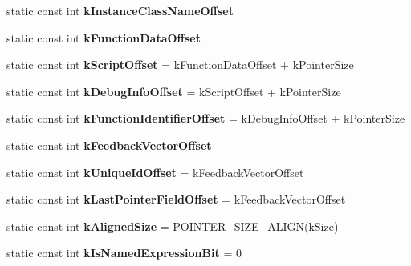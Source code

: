 \begin{DoxyCompactItemize}
\item 
static const int {\bfseries k\+Instance\+Class\+Name\+Offset}
\item 
static const int {\bfseries k\+Function\+Data\+Offset}
\item 
static const int {\bfseries k\+Script\+Offset} = k\+Function\+Data\+Offset + k\+Pointer\+Size\hypertarget{classv8_1_1internal_1_1_shared_function_info_a1fdab5516ff08f6876cffc0a75e18c44}{}\label{classv8_1_1internal_1_1_shared_function_info_a1fdab5516ff08f6876cffc0a75e18c44}

\item 
static const int {\bfseries k\+Debug\+Info\+Offset} = k\+Script\+Offset + k\+Pointer\+Size\hypertarget{classv8_1_1internal_1_1_shared_function_info_a3e5e9653b37e7a05aeec489c67aa229a}{}\label{classv8_1_1internal_1_1_shared_function_info_a3e5e9653b37e7a05aeec489c67aa229a}

\item 
static const int {\bfseries k\+Function\+Identifier\+Offset} = k\+Debug\+Info\+Offset + k\+Pointer\+Size\hypertarget{classv8_1_1internal_1_1_shared_function_info_a9a1beaaa0ed44ab0309fb99b127f1450}{}\label{classv8_1_1internal_1_1_shared_function_info_a9a1beaaa0ed44ab0309fb99b127f1450}

\item 
static const int {\bfseries k\+Feedback\+Vector\+Offset}
\item 
static const int {\bfseries k\+Unique\+Id\+Offset} = k\+Feedback\+Vector\+Offset\hypertarget{classv8_1_1internal_1_1_shared_function_info_a35f68f621426325d9e666d9ab31caca5}{}\label{classv8_1_1internal_1_1_shared_function_info_a35f68f621426325d9e666d9ab31caca5}

\item 
static const int {\bfseries k\+Last\+Pointer\+Field\+Offset} = k\+Feedback\+Vector\+Offset\hypertarget{classv8_1_1internal_1_1_shared_function_info_a94b4ac96bc87bfa5700bc6e30c56903a}{}\label{classv8_1_1internal_1_1_shared_function_info_a94b4ac96bc87bfa5700bc6e30c56903a}

\item 
static const int {\bfseries k\+Aligned\+Size} = P\+O\+I\+N\+T\+E\+R\+\_\+\+S\+I\+Z\+E\+\_\+\+A\+L\+I\+GN(k\+Size)\hypertarget{classv8_1_1internal_1_1_shared_function_info_a9948d887804c3e60228940df82fb1595}{}\label{classv8_1_1internal_1_1_shared_function_info_a9948d887804c3e60228940df82fb1595}

\item 
static const int {\bfseries k\+Is\+Named\+Expression\+Bit} = 0\hypertarget{classv8_1_1internal_1_1_shared_function_info_a3e76132af109b9e6c191699dc0875482}{}\label{classv8_1_1internal_1_1_shared_function_info_a3e76132af109b9e6c191699dc0875482}


\end{DoxyCompactItemize}
